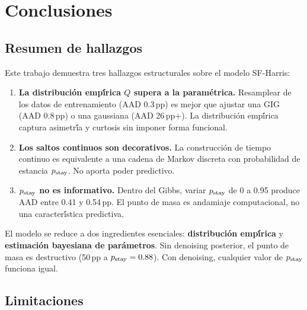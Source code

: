 
\chapter{Conclusiones}
\label{ch:conclusiones}

\section{Resumen de hallazgos}

Este trabajo demuestra tres hallazgos estructurales sobre el modelo SF-Harris:

\begin{enumerate}
    \item \textbf{La distribuci\'{o}n emp\'{\'i}rica $Q$ supera a la param\'{e}trica.}
    Resamplear de los datos de entrenamiento (AAD 0.3\,pp) es mejor que ajustar una
    GIG (AAD 0.8\,pp) o una gaussiana (AAD 26\,pp+). La distribuci\'{o}n emp\'{\'i}rica
    captura asimetr\'{\'i}a y curtosis sin imponer forma funcional.

    \item \textbf{Los saltos continuos son decorativos.} La construcci\'{o}n de
    tiempo continuo es equivalente a una cadena de Markov discreta con probabilidad
    de estancia $p_{\text{stay}}$. No aporta poder predictivo.

    \item \textbf{$p_{\text{stay}}$ no es informativo.} Dentro del Gibbs, variar $p_{\text{stay}}$
    de 0 a 0.95 produce AAD entre 0.41 y 0.54\,pp. El punto de masa es andamiaje
    computacional, no una caracter\'{\'i}stica predictiva.
\end{enumerate}

El modelo se reduce a dos ingredientes esenciales: \textbf{distribuci\'{o}n emp\'{\'i}rica}
y \textbf{estimaci\'{o}n bayesiana de par\'{a}metros}. Sin denoising posterior,
el punto de masa es destructivo (50\,pp a $p_{\text{stay}} = 0.88$). Con denoising, cualquier
valor de $p_{\text{stay}}$ funciona igual.

\section{Limitaciones}

